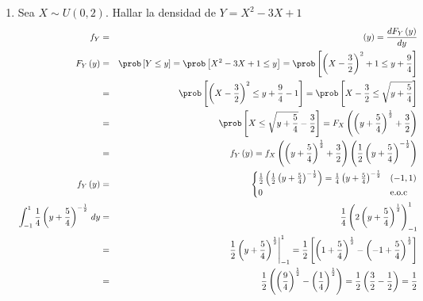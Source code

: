 \begin{enumerate}
\item Sea $X \sim U \left(0,2 \right) $. Hallar la densidad de $Y= X^2 - 3X + 1$
\begin{eqnarray*}
f_{Y}&=& \left(y \right)= \frac{dF_{Y}\left(y \right) }{dy}\\
F_{Y} \left(y \right)&=& \prob \left[ Y \leq y \right] = \prob \left[ X^2 - 3X + 1 \leq y \right] = \prob \left[ \left( X - \frac{3}{2} \right)^2 + 1 \leq y + \frac{9}{4} \right]\\
&=& \prob \left[ \left( X - \frac{3}{2} \right)^2  \leq y + \frac{9}{4}-1 \right] = \prob \left[ X- \frac{3}{2} \leq \sqrt{y+\frac{5}{4} }\right]\\
&=& \prob \left[ X \leq \sqrt{y+\frac{5}{4} } - \frac{3}{2} \right]= F_{X} \left( \left( y+\frac{5}{4} \right)^{ \frac{1}{2} } + \frac{3}{2} \right)\\
&=& f_{Y} \left(y \right)= f_{X} \left( \left(  y + \frac{5}{4}\right)^{ \frac{1}{2}}+ \frac{3}{2}    \right) \left(\frac{1}{2} \left( y + \frac{5}{4} \right)^{- \frac{1}{2} } \right)\\
f_{Y} \left( y \right) &=& \begin{cases} \frac{1}{2}  \left(\frac{1}{2} \left( y + \frac{5}{4} \right)^{- \frac{1}{2} } \right)= \frac{1}{4} \left( y + \frac{5}{4} \right)^{-\frac{1}{2} } & \left(-1,1 \right)\\
0 & \textrm{e.o.c}
\end{cases}\\
\int_{-1}^{1} \frac{1}{4} \left( y + \frac{5}{4} \right)^{-\frac{1}{2} } \, dy &=& \frac{1}{4} \left(2 \left( y + \frac{5}{4} \right)^{ \frac{1}{2} } \right)_{-1}^{1}\\
&=& \left. \frac{1}{2} \left( y + \frac{5}{4} \right)^{\frac{1}{2}} \right|_{-1}^{1} = \frac{1}{2} \left[ \left( 1 + \frac{5}{4} \right)^{ \frac{1}{2} } - \left(-1 + \frac{5}{4} \right)^{ \frac{1}{2} } \right]\\
&=& \frac{1}{2} \left( \left(\frac{9}{4} \right)^{ \frac{1}{2}} - \left(\frac{1}{4} \right)^{ \frac{1}{2}} \right) = \frac{1}{2} \left( \frac{3}{2} - \frac{1}{2} \right) = \frac{1}{2}
\end{eqnarray*}


\end{enumerate}
